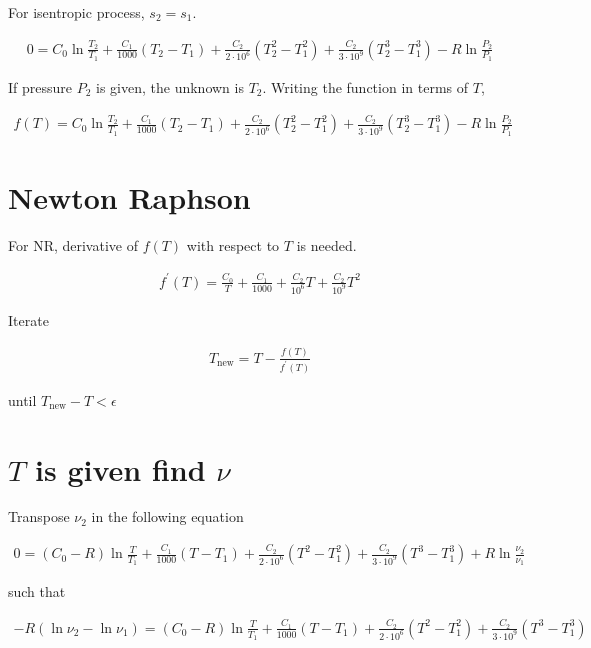 \documentclass{article}
\begin{document}
	For isentropic process, $s_2=s_1$.

	\begin{align*}
		0 = C_0\ln\frac{T_2}{T_1} + \frac{C_1}{1000}(T_2 - T_1) + \frac{C_2}{2\cdot10^6}(T_2^2 - T_1^2) + \frac{C_2}{3\cdot10^9}(T_2^3 - T_1^3) - R\ln\frac{P_2}{P_1}
	\end{align*}

	If pressure $P_2$ is given, the unknown is $T_2$. Writing the function in terms of $T$,

	\begin{align*}
		f(T) = C_0\ln\frac{T_2}{T_1} + \frac{C_1}{1000}(T_2 - T_1) + \frac{C_2}{2\cdot10^6}(T_2^2 - T_1^2) + \frac{C_2}{3\cdot10^9}(T_2^3 - T_1^3) - R\ln\frac{P_2}{P_1}
	\end{align*}
	
	\section{Newton Raphson}

	For NR, derivative of $f(T)$ with respect to $T$ is needed.

	\begin{align*}
		f^\prime(T) = \frac{C_0}{T} + \frac{C_1}{1000} + \frac{C_2}{10^6}T + \frac{C_2}{10^9}T^2
	\end{align*}

	Iterate

	\begin{align*}
		T_\text{new} = T - \frac{f(T)}{f^\prime(T)}
	\end{align*}

	until $T_\text{new} - T < \epsilon$

	\section{$T$ is given find $\nu$}

	Transpose $\nu_2$ in the following equation

	\begin{align*}
		0 = (C_0 - R)\ln\frac{T}{T_1} + \frac{C_1}{1000}(T - T_1) + \frac{C_2}{2\cdot10^6}(T^2 - T_1^2) + \frac{C_2}{3\cdot10^9}(T^3 - T_1^3) + R\ln\frac{\nu_2}{\nu_1}
	\end{align*}

	such that

	\begin{align*}
		-R(\ln\nu_2 - \ln\nu_1) = (C_0 - R)\ln\frac{T}{T_1} + \frac{C_1}{1000}(T - T_1) + \frac{C_2}{2\cdot10^6}(T^2 - T_1^2) + \frac{C_2}{3\cdot10^9}(T^3 - T_1^3)
	\end{align*}
\end{document}
